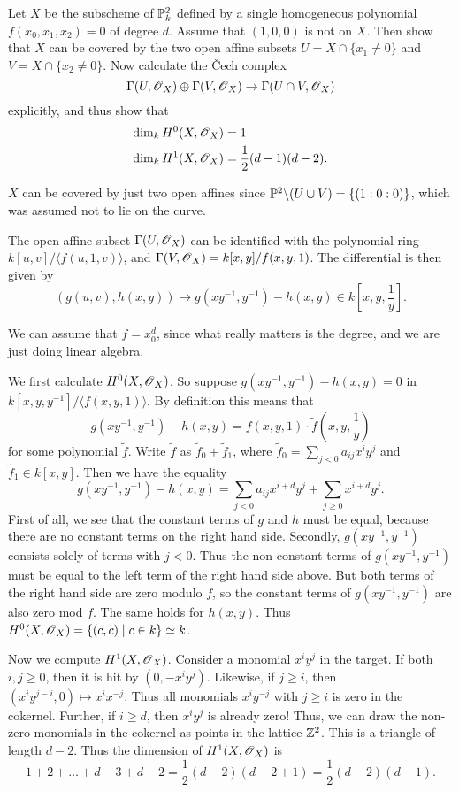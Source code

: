 \documentclass[11pt, english]{article}
\begin{document}
\begin{exc}[Exercise 4.7]
Let $X$ be the subscheme of $\mathbb{P}_k^2$ defined by a single homogeneous polynomial $f(x_0,x_1,x_2)=0$ of degree $d$. Assume that $(1,0,0)$ is not on $X$. Then show that $X$ can be covered by the two open affine subsets $U= X \cap \{ x_1 \neq 0\}$ and $V = X \cap \{ x_2 \neq 0\}$. Now calculate the \v Cech complex
\[
\Gamma(U,\operatorname{\mathscr{O}}_X) \oplus \Gamma(V,\operatorname{\mathscr{O}}_X) \to \Gamma(U \cap V, \operatorname{\mathscr{O}}_X)
\]
explicitly, and thus show that
\begin{align*}
  \dim_k H^0(X,\operatorname{\mathscr{O}}_X) &= 1 \\
\dim _k H^1(X,\operatorname{\mathscr{O}}_X) &= \frac 12 (d-1)(d-2).
\end{align*}
\end{exc}

\begin{sol}
  $X$ can be covered by just two open affines since $\mathbb{P}^2 \backslash (U \cup V) = \{(1:0:0)\}$, which was assumed not to lie on the curve.

The open affine subset $\Gamma(U, \operatorname{\mathscr{O}}_X)$ can be identified with the polynomial ring $k[u,v]/\langle f(u,1,v) \rangle$, and $\Gamma(V,\operatorname{\mathscr{O}}_X) = k[x,y]/f(x,y,1)$. The differential is then given by 
\[
\left( g(u,v), h(x,y) \right) \mapsto g(xy^{-1},y^{-1})-h(x,y) \in k[x,y,\frac 1y].
\]

We can assume that $f=x_0^d$, since what really matters is the degree, and we are just doing linear algebra.

We first calculate $H^0(X,\operatorname{\mathscr{O}}_X)$. So suppose $g(xy^{-1}, y^{-1})-h(x,y)=0$ in $k[x,y,y^{-1}]/\langle f(x,y,1) \rangle$. By definition this means that
\[
g(xy^{-1},y^{-1}) - h(x,y) = f(x,y,1) \cdot \tilde f(x,y,\frac 1y)
\]
for some polynomial $\tilde f$. Write $\tilde f$ as $\tilde f_0 + \tilde f_1$, where $\tilde f_0=\sum_{j < 0} a_{ij} x^i y^j$ and $\tilde f_1 \in k[x,y]$. Then we have the equality
\[
g(xy^{-1},y^{-1}) - h(x,y) = \sum_{j < 0} a_{ij}x^{i+d}y^j + \sum_{j \geq 0} x^{i+d} y^j.
\]
First of all, we see that the constant terms of $g$ and $h$ must be equal, because there are no constant terms on the right hand side. Secondly, $g(xy^{-1},y^{-1})$ consists solely of terms with $j < 0$. Thus the non constant terms of  $g(xy^{-1},y^{-1})$ must be equal to the left term of the right hand side above. But both terms of the right hand side are zero modulo $f$, so the constant terms of $g(xy^{-1},y^{-1})$ are also zero mod $f$. The same holds for $h(x,y)$. Thus $H^0(X,\operatorname{\mathscr{O}}_X)= \{ (c,c) \mid c \in k \} \simeq k$.

Now we compute $H^1(X,\operatorname{\mathscr{O}}_X)$. Consider a monomial $x^iy^j$ in the target. If both $i,j \geq 0$, then it is hit by $(0,-x^iy^j)$. Likewise, if $j \geq i$, then $(x^iy^{j-i},0) \mapsto x^i x^{-j}$. Thus all monomials $x^iy^{-j}$ with $j \geq i$ is zero in the cokernel. Further, if $i \geq d$, then $x^i y^j$ is already zero! Thus, we can draw the non-zero monomials in the cokernel as points in the lattice $\mathbb{Z}^2$. This is a triangle of length $d-2$. Thus the dimension of $H^1(X,\operatorname{\mathscr{O}}_X)$ is 
\[
1 + 2 + \ldots+ d-3 + d-2 = \frac 12 (d-2)(d-2+1) = \frac 12 (d-2)(d-1).
\]
\end{sol}
\end{document}
